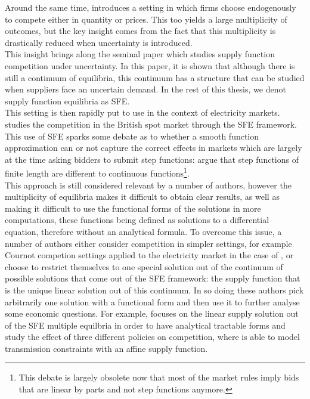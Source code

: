 Around the same time, \cite{klemperer1986price} introduces a setting in which firms choose endogenously to compete either in quantity or prices. This too yields a large multiplicity of outcomes, but the key insight comes from the fact that this multiplicity is drastically reduced when uncertainty is introduced.\\

This insight brings along the seminal paper \cite{KM} which studies supply function competition under uncertainty. In this paper, it is shown that although there is still a continuum of equilibria, this continuum has a structure that can be studied when suppliers face an uncertain demand. In the rest of this thesis, we denot supply function equilibria as SFE. \\

This setting is then rapidly put to use in the context of electricity markets. \cite{Newgreen} studies the competition in the British spot market through the SFE framework. \\

This use of SFE sparks some debate as to whether a smooth function approximation can or not capture the correct effects in markets which are largely at the time asking bidders to submit step functions:  \cite{von1993spot} argue that step functions of finite length are different to continuous functions\footnote{This debate is largely obsolete now that most of the market rules imply bids that are linear by parts and not step functions anymore.}.\\

This approach is still considered relevant by a number of authors, however the multiplicity of equilibria makes it difficult to obtain clear results, as well as making it difficult to use the functional forms of the solutions in more computations, these functions being defined as solutions to a differential equation, therefore without an analytical formula. To overcome this issue, a number of authors either consider competition in simpler settings, for example Cournot competion settings applied to the electricity market in the case of \cite{borenstein1999empirical}, or choose to restrict themselves to one special solution out of the continuum of possible solutions that come out of the SFE framework: the supply function that is the unique linear solution out of this continuum. In so doing these authors pick arbitrarily one solution with a functional form and then use it to further analyse some economic questions. For example, \cite{green1996increasing} focuses on the linear supply solution out of the SFE multiple equilbria in order to have analytical tractable forms and study the effect of three different policies on competition, where 
\cite{hobbs2000strategic} is able to model transmission constraints with an affine supply function.\\


